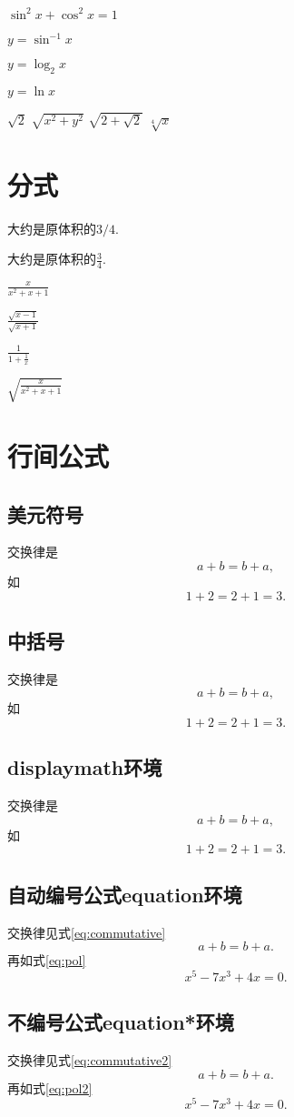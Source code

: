 \documentclass{article}
\begin{document}
	$\sin^2 x + \cos^2 x = 1$
	
	$y = \sin^{-1} x$
	
	$y = \log_2 x$
	
	$y = \ln x$
	
	$\sqrt{2}$
	$\sqrt{x^2+y^2}$
	$\sqrt{2+\sqrt{2}}$
	$\sqrt[4]{x}$
	\section{分式}
	大约是原体积的$3/4$.
	
	大约是原体积的$\frac{3}{4}$.
	
	$\frac{x}{x^2+x+1}$
	
	$\frac{\sqrt{x-1}}{\sqrt{x+1}}$
	
	$\frac{1}{1+\frac{1}{x}}$
	
	$\sqrt{\frac{x}{x^2+x+1}}$
	\section{行间公式}
		\subsection{美元符号}
			交换律是
			$$a+b=b+a,$$
			如
			$$1+2=2+1=3.$$
		\subsection{中括号}
			交换律是\[a+b=b+a,\]如\[1+2=2+1=3.\]
		\subsection{displaymath环境}
			交换律是
			\begin{displaymath}
				a+b=b+a,
			\end{displaymath}
			如
			\begin{displaymath}
				1+2=2+1=3.
			\end{displaymath}
		\subsection{自动编号公式equation环境}
			交换律见式\ref{eq:commutative}
			\begin{equation}
				a+b=b+a. \label{eq:commutative}
			\end{equation}
			再如式\ref{eq:pol}
			\begin{equation}
				x^5 - 7x^3 + 4x = 0. \label{eq:pol}
			\end{equation}
		\subsection{不编号公式equation*环境}
			交换律见式\ref{eq:commutative2}
			\begin{equation*}
				a+b=b+a. \label{eq:commutative2}
			\end{equation*}
			再如式\ref{eq:pol2}
			\begin{equation*}
				x^5 - 7x^3 + 4x = 0. \label{eq:pol2}
			\end{equation*}
\end{document}
